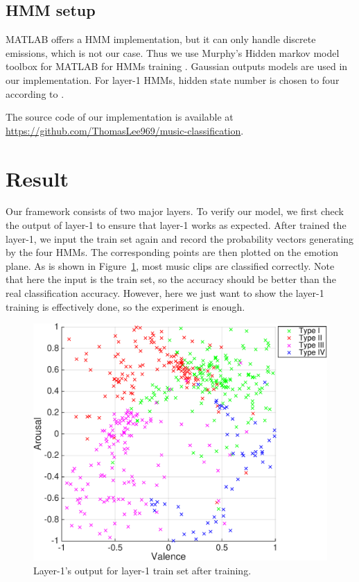 \documentclass{IEEEtran}
\begin{document}
  \subsection{HMM setup}

  MATLAB offers a HMM implementation, but it can only handle discrete
  emissions, which is not our case. Thus we use Murphy's Hidden markov model
  toolbox for MATLAB for HMMs training \cite{murphy1998hidden}. Gaussian
  outputs models are used in our implementation. For layer-1 HMMs, hidden state number is chosen to four according to
  \cite{chai2001folk}.

  The source code of our implementation is available at
  \url{https://github.com/ThomasLee969/music-classification}.


  \section{Result}
  \label{sec:Result}

  Our framework consists of two major layers. To verify our model, we first
  check the output of layer-1 to ensure that layer-1 works as expected. After
  trained the layer-1, we input the train set again and record the
  probability vectors generating by the four HMMs. The corresponding points
  are then plotted on the emotion plane. As is shown in
  Figure~\ref{fig:trainset}, most music clips are classified correctly. Note
  that here the input is the train set, so the accuracy should be better than the real
  classification accuracy. However, here we just want to show
  the layer-1 training is effectively done, so the experiment is enough.

  \begin{figure}[htbp]
    \centering
    \includegraphics[width=\columnwidth]{trainset.pdf}
    \caption{Layer-1's output for layer-1 train set after training.}
    \label{fig:trainset}
  \end{figure}
\end{document}
